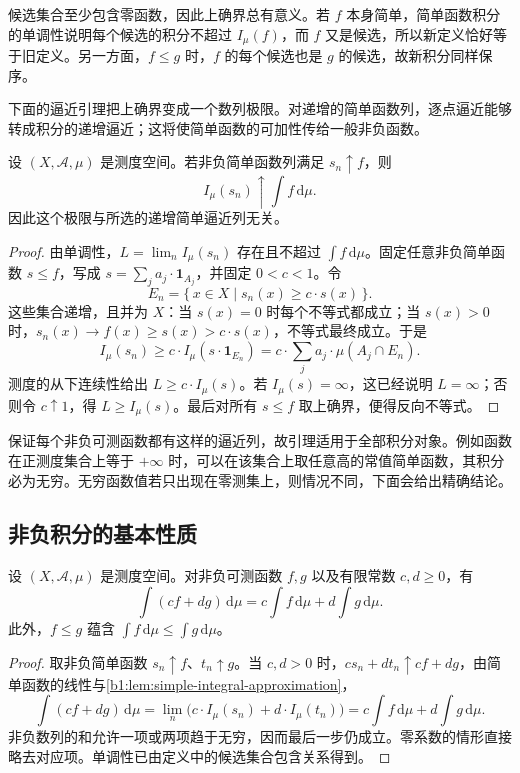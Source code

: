 候选集合至少包含零函数，因此上确界总有意义。若 \(f\) 本身简单，简单函数积分的单调性说明每个候选的积分不超过 \(I_\mu(f)\)，而 \(f\) 又是候选，所以新定义恰好等于旧定义。另一方面，\(f\leq g\) 时，\(f\) 的每个候选也是 \(g\) 的候选，故新积分同样保序。

\ProseParagraphBreak

下面的逼近引理把上确界变成一个数列极限。对递增的简单函数列，逐点逼近能够转成积分的递增逼近；这将使简单函数的可加性传给一般非负函数。

\begin{lemma}\label{b1:lem:simple-integral-approximation}
设 \((X,\mathcal A,\mu)\) 是测度空间。若非负简单函数列满足 \(s_n\uparrow f\)，则
\[
I_\mu(s_n)\uparrow\int f\,\mathrm d\mu.
\]
因此这个极限与所选的递增简单逼近列无关。
\end{lemma}
\begin{proof}
由单调性，\(L=\lim_n I_\mu(s_n)\) 存在且不超过 \(\int f\,\mathrm d\mu\)。固定任意非负简单函数 \(s\leq f\)，写成 \(s=\sum_ja_j\cdot\mathbf1_{A_j}\)，并固定 \(0<c<1\)。令
\[
E_n=\{\,x\in X\mid s_n(x)\geq c\cdot s(x)\,\}.
\]
这些集合递增，且并为 \(X\)：当 \(s(x)=0\) 时每个不等式都成立；当 \(s(x)>0\) 时，\(s_n(x)\to f(x)\geq s(x)>c\cdot s(x)\)，不等式最终成立。于是
\[
I_\mu(s_n)\geq c\cdot I_\mu(s\cdot\mathbf1_{E_n})
=c\cdot\sum_j a_j\cdot\mu(A_j\cap E_n).
\]
测度的从下连续性给出 \(L\geq c\cdot I_\mu(s)\)。若 \(I_\mu(s)=\infty\)，这已经说明 \(L=\infty\)；否则令 \(c\uparrow1\)，得 \(L\geq I_\mu(s)\)。最后对所有 \(s\leq f\) 取上确界，便得反向不等式。
\end{proof}

保证每个非负可测函数都有这样的逼近列，故引理适用于全部积分对象。例如函数在正测度集合上等于 \(+\infty\) 时，可以在该集合上取任意高的常值简单函数，其积分必为无穷。无穷函数值若只出现在零测集上，则情况不同，下面会给出精确结论。

\subsection{非负积分的基本性质}
\label{b1:subsec:050103}

\begin{proposition}\label{b1:prop:nonnegative-integral-linearity}
设 \((X,\mathcal A,\mu)\) 是测度空间。对非负可测函数 \(f,g\) 以及有限常数 \(c,d\geq0\)，有
\[
\int(cf+dg)\,\mathrm d\mu
=c\int f\,\mathrm d\mu+d\int g\,\mathrm d\mu.
\]
此外，\(f\leq g\) 蕴含 \(\int f\,\mathrm d\mu\leq\int g\,\mathrm d\mu\)。
\end{proposition}
\begin{proof}
取非负简单函数 \(s_n\uparrow f\)、\(t_n\uparrow g\)。当 \(c,d>0\) 时，\(cs_n+dt_n\uparrow cf+dg\)，由简单函数的线性与\cref{b1:lem:simple-integral-approximation}，
\[
\int(cf+dg)\,\mathrm d\mu
=\lim_n\bigl(c\cdot I_\mu(s_n)+d\cdot I_\mu(t_n)\bigr)
=c\int f\,\mathrm d\mu+d\int g\,\mathrm d\mu.
\]
非负数列的和允许一项或两项趋于无穷，因而最后一步仍成立。零系数的情形直接略去对应项。单调性已由定义中的候选集合包含关系得到。
\end{proof}

